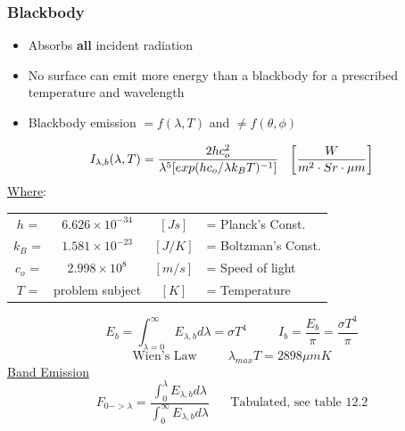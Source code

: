 \documentclass[twocolumn, 12pt]{article}
\begin{document}
\subsubsection*{Blackbody}
\begin{itemize}
    \item Absorbs \textbf{all} incident radiation
    \item No surface can emit more energy than a blackbody for a prescribed temperature and wavelength
    \item Blackbody emission \(=f(\lambda ,T)\) and \(\neq f(\theta,\phi )\)  
\end{itemize}
\begin{equation*}
    I_{\lambda,b} (\lambda, T) = \frac{2hc_o^2  }{ \lambda^5 [exp(hc_o/\lambda k_B T)^{-1}]}\hspace{7.5pt} \left[ \frac{W}{m^2 \cdot Sr \cdot \mu m} \right]
\end{equation*}
\underline{Where}:\\
\hspace{-20pt}
\begin{tabular}{|c c c l|}
    \hline
    \(h\) =& \(6.626 \times 10^{-34}\) &\([Js]\) &= Planck's Const.\\
    \(k_B\) =& \(1.581\times 10 ^ {-23}\)& \([J/K]\) &= Boltzman's Const.\\
    \(c_o\) =& \(2.998 \times 10^8 \)& \([m/s]\) &= Speed of light\\
    \(T\) =& problem subject & \([K]\) &= Temperature\\
    \hline
\end{tabular}
\begin{equation*}
     E_b = \int_{\lambda=0}^\infty E_{\lambda,b} d\lambda = \sigma T^4 \hspace{30pt}I_b = \frac{E_b}{\pi} = \frac{\sigma T^4}{\pi}
\end{equation*}
\begin{equation*}
    \text{Wien's Law} \hspace{30pt} \lambda_{max}T = 2898 \mu m K  
\end{equation*}
\underline{Band Emission}
\begin{equation*}
    F_{0->\lambda} = \frac{\int_0^\lambda E_{\lambda,b} d\lambda}{\int_0^\infty E_{\lambda,b} d\lambda} \hspace{20pt} \text{Tabulated, see table 12.2}
\end{equation*}


\end{document}
